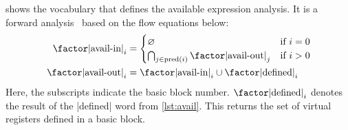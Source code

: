  shows the vocabulary that defines the available expression
analysis.  It is a forward analysis~ based on the flow equations
below:
\begin{align*}
  \text{\factor|avail-in|}_i &=
    \begin{cases}
      \varnothing
        & \text{if $i=0$} \\
      \bigcap_{j\in\mathrm{pred}(i)}\text{\factor|avail-out|}_j
        & \text{if $i>0$}
    \end{cases} \\
  \text{\factor|avail-out|}_i &= \text{\factor|avail-in|}_i
                                 \cup 
                                 \text{\factor|defined|}_i
\end{align*}
%
\noindent Here, the subscripts indicate the basic block number.
$\text{\factor|defined|}_i$ denotes the result of the \factor|defined| word
from \vref{lst:avail}.  This returns the set of virtual registers defined in a
basic block.
